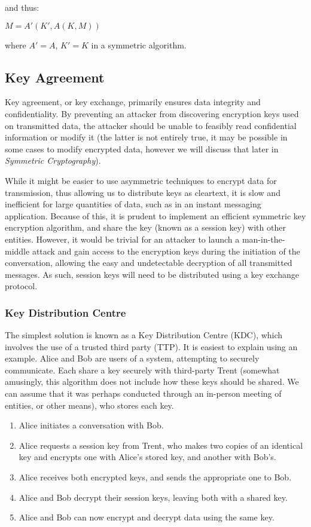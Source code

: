 and thus:

$M = A'(K',A(K,M))$

where $A' = A$, $K' = K$ in a symmetric algorithm.

\subsection{Key Agreement}

Key agreement, or key exchange, primarily ensures data integrity and confidentiality. By preventing an attacker from discovering encryption keys used on transmitted data, the attacker should be unable to feasibly read confidential information or modify it (the latter is not entirely true, it may be possible in some cases to modify encrypted data, however we will discuss that later in \emph{Symmetric Cryptography}).

While it might be easier to use asymmetric techniques to encrypt data for transmission, thus allowing us to distribute keys as cleartext, it is slow and inefficient for large quantities of data, such as in an instant messaging application. Because of this, it is prudent to implement an efficient symmetric key encryption algorithm, and share the key (known as a session key) with other entities. However, it would be trivial for an attacker to launch a man-in-the-middle attack and gain access to the encryption keys during the initiation of the conversation, allowing the easy and undetectable decryption of all transmitted messages. As such, session keys will need to be distributed using a key exchange protocol.

\subsubsection{Key Distribution Centre}

The simplest solution is known as a Key Distribution Centre (KDC), which involves the use of a trusted third party (TTP). It is easiest to explain using an example. Alice and Bob are users of a system, attempting to securely communicate. Each share a key securely with third-party Trent (somewhat amusingly, this algorithm does not include how these keys should be shared. We can assume that it was perhaps conducted through an in-person meeting of entities, or other means), who stores each key. 

\begin{enumerate}
	\item Alice initiates a conversation with Bob.
	\item Alice requests a session key from Trent, who makes two copies of an identical key and encrypts one with Alice's stored key, and another with Bob's.
	\item Alice receives both encrypted keys, and sends the appropriate one to Bob.
	\item Alice and Bob decrypt their session keys, leaving both with a shared key.
	\item Alice and Bob can now encrypt and decrypt data using the same key.
\end{enumerate}

